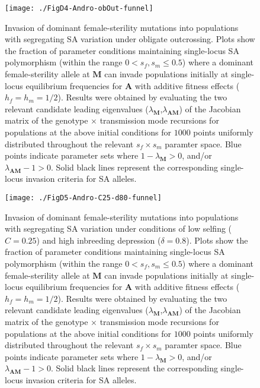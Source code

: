 \documentclass{article}
\begin{document}
\begin{figure}[ht!]
\centering
\texttt{[image: ./FigD4-Andro-obOut-funnel]}
\caption{Invasion of dominant female-sterility mutations into populations with segregating SA variation under obligate outcrossing. Plots show the fraction of parameter conditions maintaining single-locus SA polymorphism (within the range $0 < s_f,s_m \leq 0.5$) where a dominant female-sterility allele at $\mathbf{M}$ can invade populations initially at single-locus equilibrium frequencies for $\mathbf{A}$ with additive fitness effects ($h_f=h_m=1/2$). Results were obtained by evaluating the two relevant candidate leading eigenvalues ($\lambda_{\mathbf{M}}$,$\lambda_{\mathbf{AM}}$) of the Jacobian matrix of the genotype $\times$ transmission mode recursions for populations at the above initial conditions for $1000$ points uniformly distributed throughout the relevant $s_f \times s_m$ paramter space. Blue points indicate parameter sets where $1 - \lambda_{\mathbf{M}} > 0$, and/or $\lambda_{\mathbf{AM}} - 1 > 0$. Solid black lines represent the corresponding single-locus invasion criteria for SA alleles.}
\label{fig:AndroObOutFunnel}
\end{figure}
\newpage{}

\begin{figure}[ht!]
\centering
\texttt{[image: ./FigD5-Andro-C25-d80-funnel]}
\caption{Invasion of dominant female-sterility mutations into populations with segregating SA variation under conditions of low selfing ($C = 0.25$) and high inbreeding depression ($\delta = 0.8$). Plots show the fraction of parameter conditions maintaining single-locus SA polymorphism (within the range $0 < s_f,s_m \leq 0.5$) where a dominant female-sterility allele at $\mathbf{M}$ can invade populations initially at single-locus equilibrium frequencies for $\mathbf{A}$ with additive fitness effects ($h_f=h_m=1/2$). Results were obtained by evaluating the two relevant candidate leading eigenvalues ($\lambda_{\mathbf{M}}$,$\lambda_{\mathbf{AM}}$) of the Jacobian matrix of the genotype $\times$ transmission mode recursions for populations at the above initial conditions for $1000$ points uniformly distributed throughout the relevant $s_f \times s_m$ paramter space. Blue points indicate parameter sets where $1 - \lambda_{\mathbf{M}} > 0$, and/or $\lambda_{\mathbf{AM}} - 1 > 0$. Solid black lines represent the corresponding single-locus invasion criteria for SA alleles.}
\label{fig:AndC25d80Funnel}
\end{figure}
\newpage{}
\end{document}

